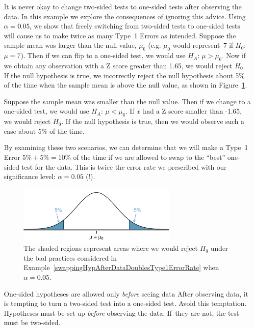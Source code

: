 \begin{example}{It is never okay to change two-sided tests to one-sided tests after observing the data. In this example we explore the consequences of ignoring this advice. Using $\alpha=0.05$, we show that freely switching from two-sided tests to one-sided tests will cause us to make twice as many Type~1 Errors as intended.} \label{swappingHypAfterDataDoublesType1ErrorRate}
Suppose the sample mean was larger than the null value, $\mu_0$ (e.g. $\mu_0$ would represent~7 if $H_0$:~$\mu = 7$). Then if we can flip to a one-sided test, we would use $H_A$: $\mu > \mu_0$. Now if we obtain any observation with a Z score greater than 1.65, we would reject $H_0$. If the null hypothesis is true, we incorrectly reject the null hypothesis about 5\% of the time when the sample mean is above the null value, as shown in Figure~\ref{type1ErrorDoublingExampleFigure}.

Suppose the sample mean was smaller than the null value. Then if we change to a one-sided test, we would use $H_A$: $\mu < \mu_0$. If $\bar{x}$ had a Z score smaller than -1.65, we would reject $H_0$. If the null hypothesis is true, then we would observe such a case about 5\% of the time.

By examining these two scenarios, we can determine that we will make a Type~1 Error $5\%+5\%=10\%$ of the time if we are allowed to swap to the ``best'' one-sided test for the data. This is twice the error rate we prescribed with our significance level: $\alpha=0.05$ (!).

\begin{figure}
   \centering
   \includegraphics[width=0.7\textwidth]{04/figures/type1ErrorDoublingExampleFigure/type1ErrorDoublingExampleFigure}
   \caption{The shaded regions represent areas where we would reject $H_0$ under the bad practices considered in Example~\ref{swappingHypAfterDataDoublesType1ErrorRate} when $\alpha = 0.05$.}
   \label{type1ErrorDoublingExampleFigure}
\end{figure}

\end{example}

\begin{caution}{One-sided hypotheses are allowed only \emph{before} seeing data}
{After observing data, it is tempting to turn a two-sided test into a one-sided test. Avoid this temptation. Hypotheses must be set up \emph{before} observing the data. If~they are not, the test must be two-sided.}
\end{caution}

